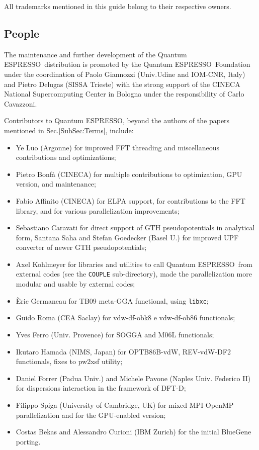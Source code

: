 \documentclass[12pt,a4paper]{article}
\def\qe{{\sc Quantum ESPRESSO}}
\def\libxc{\texttt{libxc}}
\begin{document}
All trademarks mentioned in this guide belong to their respective owners.

\subsection{People}

The maintenance and further development of the \qe\ distribution
is promoted by the \qe\ Foundation under the coordination of
Paolo Giannozzi (Univ.Udine and IOM-CNR, Italy) and Pietro Delugas
(SISSA Trieste) with the strong support
of the CINECA National Supercomputing Center in Bologna under
the responsibility of Carlo Cavazzoni.

Contributors to \qe, beyond the authors of the papers
mentioned in Sec.\ref{SubSec:Terms}, include:
\begin{itemize}
  \item Ye Luo (Argonne) for improved FFT threading and miscellaneous
  contributions and optimizations;
  \item Pietro Bonf\`a (CINECA) for multiple contributions to optimization,
  GPU version, and maintenance;
  \item Fabio Affinito (CINECA) for ELPA support, for contributions
  to the FFT library, and for various parallelization improvements;
  \item Sebastiano Caravati for direct support of GTH pseudopotentials
  in analytical form, Santana Saha and Stefan Goedecker (Basel U.)
  for improved UPF converter of newer GTH pseudopotentials;
  \item Axel Kohlmeyer for libraries and utilities to call \qe\
  from external codes (see the \texttt{COUPLE} sub-directory), made the
  parallelization more modular and usable by external codes;
  \item \`Eric Germaneau for TB09 meta-GGA functional, using \libxc;
  \item Guido Roma (CEA Saclay) for  vdw-df-obk8  e vdw-df-ob86 functionals; 
  \item Yves Ferro (Univ. Provence) for SOGGA and M06L functionals; 
  \item Ikutaro Hamada (NIMS, Japan) for OPTB86B-vdW, REV-vdW-DF2
    functionals, fixes to pw2xsf utility;
  \item Daniel Forrer (Padua Univ.) and Michele Pavone
  (Naples Univ. Federico II) for dispersions interaction in the
  framework of DFT-D;
  \item Filippo Spiga (University of Cambridge, UK) for mixed MPI-OpenMP
  parallelization and for the GPU-enabled version;
  \item Costas Bekas and Alessandro Curioni (IBM Zurich) for the initial
  BlueGene porting.
\end{itemize}
\end{document}
